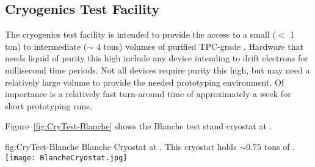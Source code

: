 \subsection{Cryogenics Test Facility}
\label{sec:fdgen-slow-cryo-test-facil}
The cryogenics test facility is intended to provide the access to a small ($<$ \num{1} ton) to intermediate ($\sim$ \num{4} tons) volumes of purified TPC-grade \lar{}. Hardware that needs liquid of purity this high include any device intending to drift electrons for millisecond time periods. Not all devices require purity this high, but may need a relatively large volume to provide the needed prototyping environment. Of importance is a relatively fast turn-around time of approximately a week for short prototyping runs.

Figure~\ref{fig:CryTest-Blanche} shows the Blanche test stand cryostat at \fnal.

\begin{dunefigure}{fig:CryTest-Blanche} 
  {Blanche Cryostat at \fnal. This cryostat holds $\sim 0.75$ tons of \lar{}.}
  \texttt{[image: BlancheCryostat.jpg]}%
\end{dunefigure}
